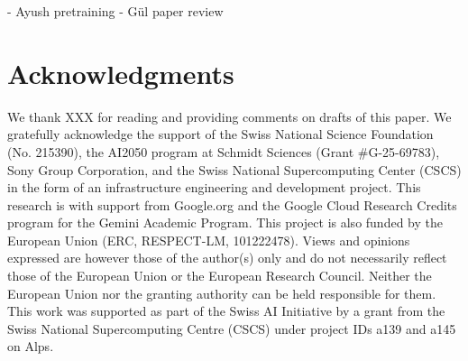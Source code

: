 - Ayush pretraining
- Gül paper review

\section*{Acknowledgments}

We thank XXX for reading and providing comments on drafts of this paper.
We gratefully acknowledge the support of the Swiss National Science Foundation (No. 215390), the AI2050 program at Schmidt Sciences (Grant \#G-25-69783), Sony Group Corporation, and the Swiss National Supercomputing Center (CSCS) in the form of an infrastructure engineering and development project. This research is with support from Google.org and the Google Cloud Research Credits program for the Gemini Academic Program. This project is also funded by the European Union (ERC, RESPECT-LM, 101222478). Views and opinions expressed are however those of the author(s) only and do not necessarily reflect those of the European Union or the European Research Council. Neither the European Union nor the granting authority can be held responsible for them.
This work was supported as part of the Swiss AI Initiative by a grant from the Swiss National Supercomputing Centre (CSCS) under project IDs a139 and a145 on Alps.
